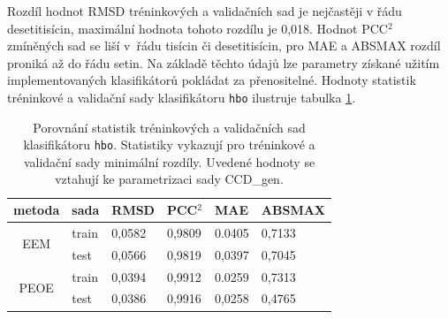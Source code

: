 Rozdíl hodnot RMSD tréninkových a validačních sad je nejčastěji v řádu desetitisícin, maximální hodnota tohoto rozdílu je 0,018. Hodnot PCC$^2$ zmíněných sad se liší v~řádu tisícin či desetitisícin, pro MAE a ABSMAX rozdíl proniká až do řádu setin. Na základě těchto údajů lze  parametry získané užitím implementovaných klasifikátorů pokládat za přenositelné. Hodnoty statistik tréninkové a validační sady klasifikátoru \verb|hbo| ilustruje tabulka \ref{prenositelnost}.

\begin{table}[t]
    \renewcommand{\arraystretch}{1.4}
    \centering
    \begin{tabular}{c|l|l|l|l|l}
         \textbf{metoda} & \textbf{sada} & \textbf{RMSD} & \textbf{PCC$^2$} & \textbf{MAE} & \textbf{ABSMAX}\\
         \hline
         \multirow{2}{4em}{EEM} & train & 0,0582 & 0,9809 & 0.0405 & 0,7133  \\
         & test & 0,0566 & 0,9819 & 0,0397 & 0,7045 \\
         \hline
         \multirow{2}{4em}{PEOE} & train & 0,0394 & 0,9912 & 0.0259 & 0,7313  \\
         & test & 0,0386  & 0,9916 & 0,0258 & 0,4765 \\
    \end{tabular}
    \caption{Porovnání statistik tréninkových a validačních sad klasifikátoru \texttt{hbo}. Statistiky vykazují pro tréninkové a validační sady minimální rozdíly. Uvedené hodnoty se vztahují ke parametrizaci sady CCD\_gen.}
    \label{prenositelnost}
\end{table}

\vspace*{0cm}

